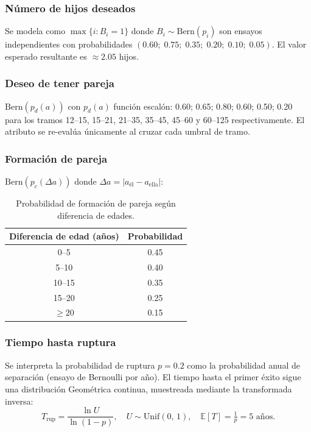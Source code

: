 \documentclass[12pt, a4paper]{article}
\newcommand{\Unif}[2]{\mathrm{Unif}\!\left(#1,\,#2\right)}
\newcommand{\Bern}[1]{\mathrm{Bern}\!\left(#1\right)}
\begin{document}
\subsubsection*{Número de hijos deseados}

Se modela como $\max\{i : B_i = 1\}$ donde $B_i \sim \Bern{p_i}$ son
ensayos independientes con probabilidades $(0.60;\; 0.75;\; 0.35;\; 0.20;\;
0.10;\; 0.05)$. El valor esperado resultante es $\approx 2.05$ hijos.

\subsubsection*{Deseo de tener pareja}

$\Bern{p_d(a)}$ con $p_d(a)$ función escalón: 0.60; 0.65; 0.80; 0.60;
0.50; 0.20 para los tramos 12--15, 15--21, 21--35, 35--45, 45--60 y
60--125 respectivamente.
El atributo se re-evalúa únicamente al cruzar cada umbral de tramo.

\subsubsection*{Formación de pareja}

$\Bern{p_c(\Delta a)}$ donde $\Delta a = |a_\text{él} - a_\text{ella}|$:

\begin{table}[H]
  \centering
  \caption{Probabilidad de formación de pareja según diferencia de edades.}
  \label{tab:pareja}
  \begin{tabular}{@{}cc@{}}
    \toprule
    \textbf{Diferencia de edad (años)} & \textbf{Probabilidad} \\
    \midrule
    0--5    & 0.45 \\
    5--10   & 0.40 \\
    10--15  & 0.35 \\
    15--20  & 0.25 \\
    $\geq 20$ & 0.15 \\
    \bottomrule
  \end{tabular}
\end{table}

\subsubsection*{Tiempo hasta ruptura}

Se interpreta la probabilidad de ruptura $p = 0.2$ como la probabilidad
anual de separación (ensayo de Bernoulli por año). El tiempo hasta el
primer éxito sigue una distribución Geométrica continua, muestreada
mediante la transformada inversa:
\[
  T_\mathrm{rup} = \frac{\ln U}{\ln(1 - p)}, \quad U \sim \Unif{0}{1},
  \quad \mathbb{E}[T] = \tfrac{1}{p} = 5 \text{ años}.
\]
\end{document}
